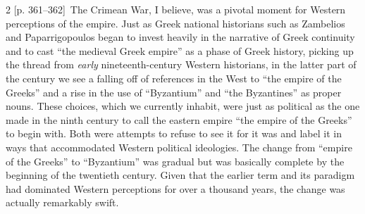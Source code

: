 \documentclass[10pt,a4paper]{article}
\begin{document}
\begin{paracol}{2}
{\scriptsize\color{gray}[p. 361–362]}\ The Crimean War, I believe, was a pivotal moment for Western perceptions of the empire. Just as Greek national historians such as Zambelios and Paparrigopoulos began to invest heavily in the narrative of Greek continuity and to cast “the medieval Greek empire” as a phase of Greek history, picking up the thread from \textit{early} nineteenth-century Western historians, in the latter part of the century we see a falling off of references in the West to “the empire of the Greeks” and a rise in the use of “Byzantium” and “the Byzantines” as proper nouns. These choices, which we currently inhabit, were just as political as the one made in the ninth century to call the eastern empire “the empire of the Greeks” to begin with. Both were attempts to refuse to see it for it was and label it in ways that accommodated Western political ideologies. The change from “empire of the Greeks” to “Byzantium” was gradual but was basically complete by the beginning of the twentieth century. Given that the earlier term and its paradigm had dominated Western perceptions for over a thousand years, the change was actually remarkably swift.\par
\switchcolumn*

\end{paracol}
\end{document}
